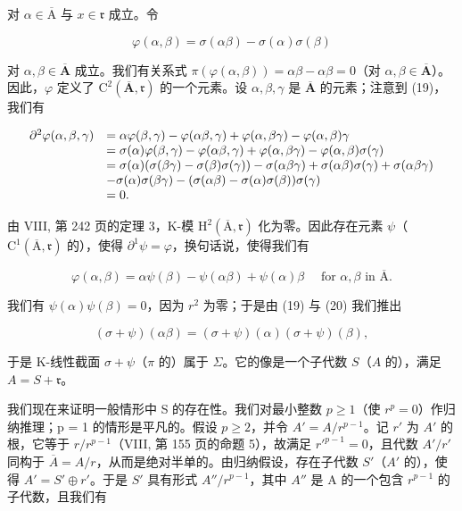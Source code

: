 对 \(\alpha \in \overline{\mathrm{A}}\) 与 \(x\in \mathfrak{r}\) 成立。令

\[
\varphi (\alpha , \beta) = \sigma (\alpha \beta) - \sigma (\alpha) \sigma (\beta)\tag{20}
\]

对 \(\alpha, \beta \in \overline{\mathbf{A}}\) 成立。我们有关系式 \(\pi(\varphi(\alpha, \beta)) = \alpha\beta - \alpha\beta = 0\)（对 \(\alpha, \beta \in \overline{\mathbf{A}}\)）。因此，\(\varphi\) 定义了 \(\mathrm{C}^2(\overline{\mathbf{A}}, \mathfrak{r})\) 的一个元素。设 \(\alpha, \beta, \gamma\) 是 \(\overline{\mathbf{A}}\) 的元素；注意到 (19)，我们有

\[
\begin{array}{r l} \partial^ {2} \varphi (\alpha , \beta , \gamma) & = \alpha \varphi (\beta , \gamma) - \varphi (\alpha \beta , \gamma) + \varphi (\alpha , \beta \gamma) - \varphi (\alpha , \beta) \gamma \\ & = \sigma (\alpha) \varphi (\beta , \gamma) - \varphi (\alpha \beta , \gamma) + \varphi (\alpha , \beta \gamma) - \varphi (\alpha , \beta) \sigma (\gamma) \\ & = \sigma (\alpha) (\sigma (\beta \gamma) - \sigma (\beta) \sigma (\gamma)) - \sigma (\alpha \beta \gamma) + \sigma (\alpha \beta) \sigma (\gamma) + \sigma (\alpha \beta \gamma) \\ & - \sigma (\alpha) \sigma (\beta \gamma) - (\sigma (\alpha \beta) - \sigma (\alpha) \sigma (\beta)) \sigma (\gamma) \\ & = 0. \end{array}
\]

由 VIII, 第 242 页的定理 3，K-模 \(\mathrm{H}^{2}(\overline{\mathrm{A}},\mathfrak{r})\) 化为零。因此存在元素 \(\psi\)（\(\mathrm{C}^{1}(\overline{\mathrm{A}},\mathfrak{r})\) 的），使得 \(\partial^{1}\psi = \varphi\)，换句话说，使得我们有

\[
\varphi (\alpha , \beta) = \alpha \psi (\beta) - \psi (\alpha \beta) + \psi (\alpha) \beta \quad \text { for } \alpha , \beta \text { in } \overline {{\mathrm{A}}}.\tag{21}
\]

我们有 \(\psi(\alpha)\psi(\beta)=0\)，因为 \(r^{2}\) 为零；于是由 (19) 与 (20) 我们推出

\[
(\sigma + \psi) (\alpha \beta) = (\sigma + \psi) (\alpha) (\sigma + \psi) (\beta),\tag{22}
\]

于是 K-线性截面 \(\sigma +\psi\)（\(\pi\) 的）属于 \(\Sigma\)。它的像是一个子代数 \(S\)（\(A\) 的），满足 \(A = S + \mathfrak{r}\)。

我们现在来证明一般情形中 S 的存在性。我们对最小整数 \(p \geqslant 1\)（使 \(r^{p} = 0\)）作归纳推理；p = 1 的情形是平凡的。假设 \(p \geqslant 2\)，并令 \(A' = A/r^{p-1}\)。记 \(r'\) 为 \(A'\) 的根，它等于 \(r/r^{p-1}\)（VIII, 第 155 页的命题 5），故满足 \(r'^{p-1} = 0\)，且代数 \(A'/r'\) 同构于 \(\overline{A} = A/r\)，从而是绝对半单的。由归纳假设，存在子代数 \(S'\)（\(A'\) 的），使得 \(A' = S' \oplus r'\)。于是 \(S'\) 具有形式 \(A''/r^{p-1}\)，其中 \(A''\) 是 A 的一个包含 \(r^{p-1}\) 的子代数，且我们有

